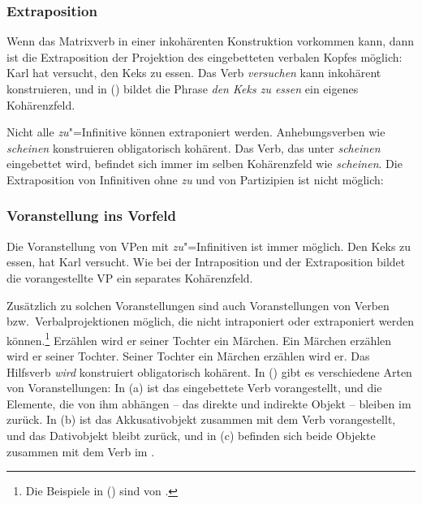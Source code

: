 \subsubsection{Extraposition}

Wenn das Matrixverb in einer inkohärenten Konstruktion vorkommen kann,
dann ist die Extraposition der Projektion des eingebetteten verbalen Kopfes möglich:
\ea
Karl hat versucht, den Keks zu essen.
\z
Das Verb \emph{versuchen} kann inkohärent konstruieren, und in () 
bildet die Phrase \emph{den Keks zu essen} ein eigenes Kohärenzfeld.

Nicht alle \emph{zu}"=Infinitive können extraponiert werden. Anhebungsverben
wie \emph{scheinen} konstruieren obligatorisch kohärent.
Das Verb, das unter \emph{scheinen} eingebettet wird, befindet sich immer
im selben Kohärenzfeld wie \emph{scheinen}.
\eal
{}
\zl
Die Extraposition von Infinitiven ohne \emph{zu} und von Partizipien
ist nicht möglich:
\eal
{}
\zl
{}

\subsubsection{Voranstellung ins Vorfeld}
\label{sec-verb-fronting}

Die Voranstellung von VPen mit \emph{zu}"=Infinitiven ist immer möglich.
\ea
Den Keks zu essen, hat Karl versucht.
\z
Wie bei der Intraposition und der Extraposition bildet die vorangestellte
VP ein separates Kohärenzfeld.

Zusätzlich zu solchen Voranstellungen sind auch Voranstellungen von Verben
bzw.\ Verbalprojektionen möglich, die nicht intraponiert oder extraponiert werden können.\footnote{
        Die Beispiele in () sind von \citet*[--721]{Haftka81a}.
}
\eal
\label{bsp-erzaehlen-wird}
\ex
Erzählen wird er seiner Tochter ein Märchen.
\ex
Ein Märchen erzählen wird er seiner Tochter.
\ex  
Seiner Tochter ein Märchen erzählen wird er.
\zl
Das Hilfsverb \emph{wird} konstruiert obligatorisch kohärent.
In () gibt es verschiedene Arten von Voranstellungen:
In (a) ist das eingebettete Verb vorangestellt, und die Elemente, die
von ihm abhängen -- das direkte und indirekte Objekt -- bleiben im \mf zurück.
In (b) ist das Akkusativobjekt zusammen mit dem Verb vorangestellt,
und das Dativobjekt bleibt zurück, und in (c) befinden sich beide Objekte
zusammen mit dem Verb im \vf.

